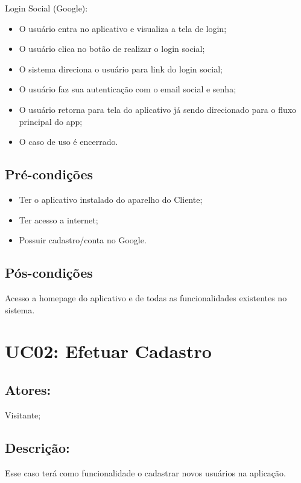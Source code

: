  Login Social (Google): 
\begin{itemize}
    \item O usuário entra no aplicativo e visualiza a tela de login;
    \item O usuário clica no botão de realizar o login social;
    \item O sistema direciona o usuário para link do login social;
    \item O usuário faz sua autenticação com o email social e senha;
    \item O usuário retorna para tela do aplicativo já sendo direcionado para o fluxo principal do app;
    \item O caso de uso é encerrado. 
\end{itemize}
\subsection{Pré-condições}
\begin{itemize}
    \item Ter o aplicativo instalado do aparelho do Cliente;
    \item Ter acesso a internet;
    \item Possuir cadastro/conta no Google. 
\end{itemize}

\subsection{Pós-condições}
Acesso a homepage do aplicativo e de todas as funcionalidades existentes no sistema. 

\section{UC02: Efetuar Cadastro}

\subsection{Atores:}
Visitante;
\subsection{Descrição:}
Esse caso terá como funcionalidade o cadastrar novos usuários na aplicação. 
